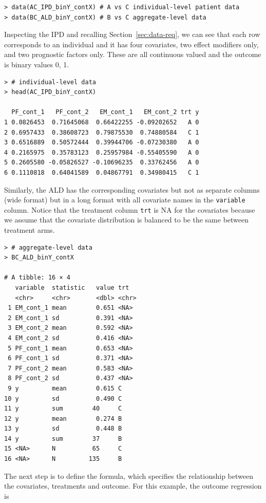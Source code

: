 \documentclass[article]{jss}
\begin{document}
\begin{verbatim}
> data(AC_IPD_binY_contX) # A vs C individual-level patient data
> data(BC_ALD_binY_contX) # B vs C aggregate-level data
\end{verbatim}

Inspecting the IPD and recalling Section~\ref{sec:data-req}, we can see that each row corresponds to an individual and it has four covariates, two effect modifiers only, and two prognostic factors only. These are all continuous valued and the outcome is binary values 0, 1.

\begin{verbatim}
> # individual-level data
> head(AC_IPD_binY_contX)

  PF_cont_1   PF_cont_2   EM_cont_1   EM_cont_2 trt y    
1 0.0826453  0.71645068  0.66422255 -0.09202652   A 0 
2 0.6957433  0.38608723  0.79875530  0.74880584   C 1  
3 0.6516889  0.50572444  0.39944706 -0.07230380   A 0 
4 0.2165975  0.35783123  0.25957984 -0.55405590   A 0 
5 0.2605580 -0.05826527 -0.10696235  0.33762456   A 0 
6 0.1110818  0.64041589  0.04867791  0.34980415   C 1 
\end{verbatim}

Similarly, the ALD has the corresponding covariates but not as separate columns (wide format) but in a long format with all covariate names in the \texttt{variable} column.  Notice that the treatment column \texttt{trt} is NA for the covariates because we assume that the covariate distribution is balanced to be the same between treatment arms.

\begin{verbatim}
> # aggregate-level data
> BC_ALD_binY_contX

# A tibble: 16 × 4
   variable  statistic   value trt  
   <chr>     <chr>       <dbl> <chr>
 1 EM_cont_1 mean        0.651 <NA> 
 2 EM_cont_1 sd          0.391 <NA> 
 3 EM_cont_2 mean        0.592 <NA> 
 4 EM_cont_2 sd          0.416 <NA> 
 5 PF_cont_1 mean        0.653 <NA> 
 6 PF_cont_1 sd          0.371 <NA> 
 7 PF_cont_2 mean        0.583 <NA> 
 8 PF_cont_2 sd          0.437 <NA> 
 9 y         mean        0.615 C    
10 y         sd          0.490 C    
11 y         sum        40     C    
12 y         mean        0.274 B    
13 y         sd          0.448 B    
14 y         sum        37     B    
15 <NA>      N          65     C    
16 <NA>      N         135     B
\end{verbatim}

The next step is to define the formula, which specifies the relationship between the covariates, treatments and outcome.
For this example, the outcome regression is
\end{document}
